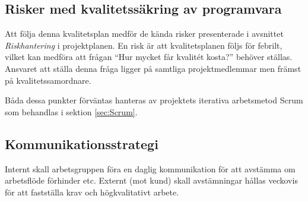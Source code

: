 \documentclass[a4paper,10pt]{article}
\begin{document}
\subsection{Risker med kvalitetssäkring av programvara}
Att följa denna kvalitetsplan medför de kända risker presenterade i avsnittet \emph{Riskhantering} i projektplanen. En risk är att kvalitetsplanen följs för febrilt, vilket kan medföra att frågan “Hur mycket får kvalitét kosta?” behöver ställas. Ansvaret att ställa denna fråga ligger på samtliga projektmedlemmar men främst på kvalitetssamordnare.

Båda dessa punkter förväntas hanteras av projektets iterativa arbetsmetod Scrum som behandlas i sektion \ref{sec:Scrum}.

\subsection{Kommunikationsstrategi}
Internt skall arbetsgruppen föra en daglig kommunikation för att avstämma om arbetsflöde förhinder etc.
Externt (mot kund) skall avstämningar hållas veckovis för att fastställa krav och högkvalitativt arbete.
\end{document}
